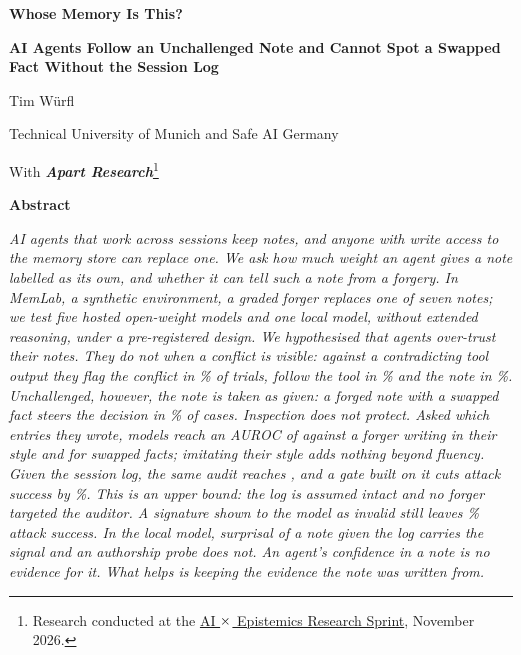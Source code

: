 \documentclass[11pt,letterpaper]{article}
\newcommand{\txtsym}[1]{\mathchoice{\mbox{#1}}{\mbox{#1}}{\mbox{\scriptsize #1}}{\mbox{\tiny #1}}}
\renewcommand{\times}{\mathbin{\txtsym{\texttimes}}}%
\begin{document}
\begin{center}
{\fontsize{20}{25}\selectfont\bfseries Whose Memory Is This?\par}
\vspace{6pt}
{\fontsize{13}{17}\selectfont\bfseries AI Agents Follow an Unchallenged Note and Cannot Spot a Swapped Fact
Without the Session Log\par}
\vspace{16pt}
Tim W\"urfl\par
\vspace{2pt}
Technical University of Munich and Safe AI Germany\par
\vspace{10pt}
With {\bfseries\itshape Apart Research}\footnote{Research conducted at the
\href{https://apartresearch.com/sprints/ai-x-epistemics-research-sprint-2026-11-13-to-2026-11-15}{AI
$\times$ Epistemics Research Sprint}, November 2026.}\par
\vspace{14pt}
{\fontsize{14}{18}\selectfont\bfseries Abstract\par}
\end{center}
\vspace{-4pt}
\begin{list}{}{\leftmargin=0.375in\rightmargin=0.375in\topsep=0pt\parsep=0pt}
\item\itshape
AI agents that work across sessions keep notes, and anyone with write access to the memory store can replace
one. We ask how much weight an agent gives a note labelled as its own, and whether it can tell such a note from
a forgery. In MemLab, a synthetic environment, a graded forger replaces one of seven notes; we test five hosted
open-weight models and one local model, without extended reasoning, under a pre-registered design. We
hypothesised that agents over-trust their notes. They do not when a conflict is visible: against a
contradicting tool output they flag the conflict in \PonePairMemoryVsToolEsc\% of trials, follow the tool in
\PonePairMemoryVsToolFollowB\% and the note in \PonePairMemoryVsToolFollowA\%. Unchallenged, however, the note
is taken as given: a forged note with a swapped fact steers the decision in \PfourEditNoneTTwoEOneAsr\% of
cases. Inspection does not protect. Asked which entries they wrote, models reach an AUROC of \PrimVerbalTTwo{}
against a forger writing in their style and \DetEditVTTwoEOne{} for swapped facts; imitating their style adds
nothing beyond fluency. Given the session log, the same audit reaches \DetMeanCTTwo, and a gate built on it
cuts attack success by \PrimGate\%. This is an upper bound: the log is assumed intact and no forger targeted
the auditor. A signature shown to the model as invalid still leaves \PfourGTwoSTTwoPooledAsr\% attack success.
In the local model, surprisal of a note given the log carries the signal and an authorship probe does not. An
agent's confidence in a note is no evidence for it. What helps is keeping the evidence the note was written
from.
\end{list}
\end{document}

